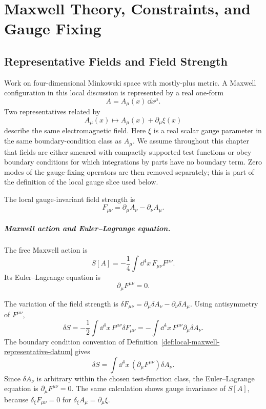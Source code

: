 \chapter{Maxwell Theory, Constraints, and Gauge Fixing}
\label{ch:maxwell-theory-constraints-gauge-fixing}
\ConventionsLorentzian


\section{Representative Fields and Field Strength}

\begin{definition}
\label{def:local-maxwell-representative-datum}
Work on four-dimensional Minkowski space with mostly-plus metric. A Maxwell
configuration in this local discussion is represented by a real one-form
\[
  A=A_\mu(x)\,\dd x^\mu .
\]
Two representatives related by
\[
  A_\mu(x)\longmapsto A_\mu(x)+\partial_\mu\xi(x)
\]
describe the same electromagnetic field. Here \(\xi\) is a real scalar
gauge parameter in the same boundary-condition class as \(A_\mu\). We assume
throughout this chapter that fields are either smeared with compactly
supported test functions or obey boundary conditions for which integrations
by parts have no boundary term. Zero modes of the gauge-fixing operators are
then removed separately; this is part of the definition of the local gauge
slice used below.

The local gauge-invariant field strength is
\[
  F_{\mu\nu}
  =
  \partial_\mu A_\nu-\partial_\nu A_\mu .
\]
\end{definition}

\paragraph{Maxwell action and Euler--Lagrange equation.}
The free Maxwell action is
\[
  S[A]
  =
  -\frac14\int\dd^4x\,F_{\mu\nu}F^{\mu\nu}.
\]
Its Euler--Lagrange equation is
\[
  \partial_\mu F^{\mu\nu}=0 .
\]

The variation of the field strength is
\(\delta F_{\mu\nu}=\partial_\mu\delta A_\nu-\partial_\nu\delta A_\mu\).
Using antisymmetry of \(F^{\mu\nu}\),
\[
  \delta S
  =
  -\frac12\int\dd^4x\,F^{\mu\nu}\delta F_{\mu\nu}
  =
  -\int\dd^4x\,F^{\mu\nu}\partial_\mu\delta A_\nu .
\]
The boundary condition convention of
Definition~\ref{def:local-maxwell-representative-datum} gives
\[
  \delta S
  =
  \int\dd^4x\,(\partial_\mu F^{\mu\nu})\delta A_\nu .
\]
Since \(\delta A_\nu\) is arbitrary within the chosen test-function class, the
Euler--Lagrange equation is \(\partial_\mu F^{\mu\nu}=0\).  The same
calculation shows gauge invariance of \(S[A]\), because
\(\delta_\xi F_{\mu\nu}=0\) for \(\delta_\xi A_\mu=\partial_\mu\xi\).

